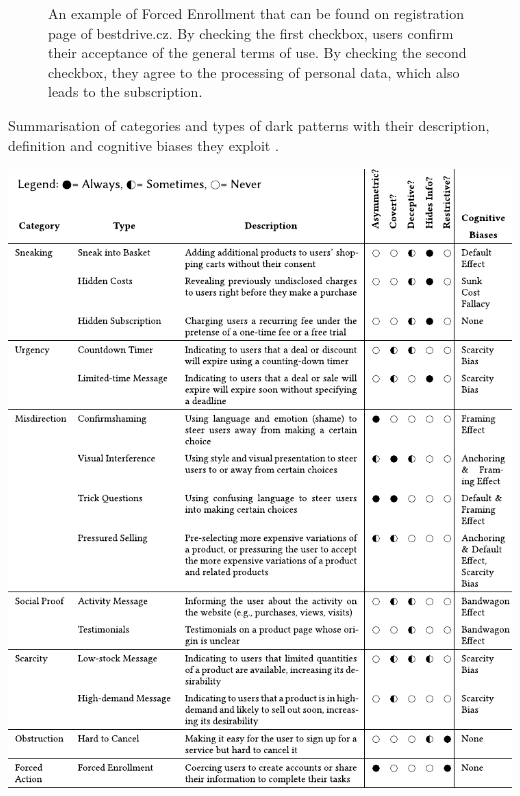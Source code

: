             \begin{figure}[ht]
                \centering
                \caption{An example of Forced Enrollment that can be found on registration page of bestdrive.cz. By checking the first checkbox, users confirm their acceptance of the general terms of use. By checking the second checkbox, they agree to the processing of personal data, which also leads to the subscription.}
                \label{fig:forced-enrollment-datart}
            \end{figure}
        
        \begin{table}
            \centering
            \caption{Summarisation of categories and types of dark patterns with their description, definition and cognitive biases they exploit \cite{dark-patterns-at-scale}.}\label{tab:darkpatterns}
            \includegraphics[width=1\textwidth]{media/dp-table.pdf}
        \end{table}